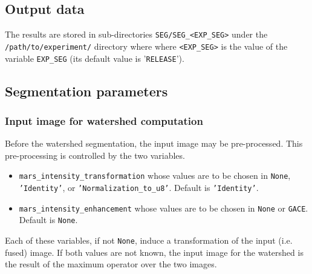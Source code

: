 \subsection{Output data}

The results are stored in sub-directories
\texttt{SEG/SEG\_<EXP\_SEG>} under the
\texttt{/path/to/experiment/} directory where where \texttt{<EXP\_SEG>} is the value of the variable \texttt{EXP\_SEG} (its
default value is '\texttt{RELEASE}'). 


\subsection{Segmentation parameters}


\subsubsection{Input image for watershed computation}

Before the watershed segmentation, the input image may be pre-processed. This pre-processing is controlled by the two variables.
\begin{itemize}
\itemsep -1ex
\item \texttt{mars\_intensity\_transformation} whose values are to be chosen in \texttt{None}, \texttt{'Identity'}, or \texttt{'Normalization\_to\_u8'}. Default is \texttt{'Identity'}.
\item \texttt{mars\_intensity\_enhancement} whose values are to be chosen in \texttt{None} or \texttt{GACE}. Default is \texttt{None}.
\end{itemize}
Each of these variables, if not \texttt{None}, induce a transformation of the input (i.e. fused) image. If both values are not known, the input image for the watershed is the result of the maximum operator over the two images.

